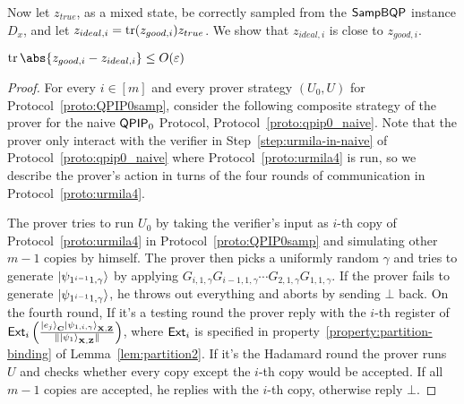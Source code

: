 Now let $z_{true}$, as a mixed state, be correctly sampled from the $\operatorname{\mathsf{SampBQP}}$ instance $D_x$,
and let $z_{ideal, i}=\operatorname{tr}(z_{good, i})z_{true}$.
We show that $z_{ideal, i}$ is close to $z_{good, i}$.
\begin{theorem}
	$\tr\abs{z_{good, i}-z_{ideal, i}}\leq O(\varepsilon)$ 
\end{theorem}
\begin{proof}


	For every $i\in [m]$ and every prover strategy $(U_0,U)$ for Protocol~\ref{proto:QPIP0samp}, consider the following composite strategy of the prover for the naive $\operatorname{\mathsf{QPIP}}_0$ Protocol, Protocol~\ref{proto:qpip0_naive}. Note that the prover only interact with the verifier in Step~\ref{step:urmila-in-naive} of Protocol~\ref{proto:qpip0_naive} where Protocol~\ref{proto:urmila4} is run, so we describe the prover's action in turns of the four rounds of communication in Protocol~\ref{proto:urmila4}.

	The prover tries to run $U_0$ by taking the verifier's input as $i$-th copy of Protocol~\ref{proto:urmila4} in Protocol~\ref{proto:QPIP0samp} and simulating other $m-1$ copies by himself. The prover then picks a uniformly random $\gamma$ and  tries to generate $\ket{\psi_{1^{i-1}1,\gamma}}$ by applying $G_{i,1,\gamma}G_{i-1,1,\gamma} \cdots G_{2,1,\gamma}G_{1,1,\gamma}$. If the prover fails to generate $\ket{\psi_{1^{i-1}1,\gamma}}$, he throws out everything and aborts by sending $\bot$ back.   On the fourth round,  If it's a testing round the prover reply with the $i$-th register of $\mathsf{Ext}_i\left(\frac{\ket{e_j}_{\mathbf{C}}\ket{\psi_{1,i,\gamma}}_{\mathbf{X},\mathbf{Z}}}{\|\ket{\psi_1}_{\mathbf{X},\mathbf{Z}}\|}\right)$, where $\mathsf{Ext}_i$ is specified in property~\ref{property:partition-binding} of Lemma~\ref{lem:partition2}. If it's the Hadamard round  the prover  runs $U$ and checks whether every copy except the $i$-th copy would be accepted. If all $m-1$ copies are accepted, he replies with the $i$-th copy, otherwise reply $\bot$.



\end{proof}
